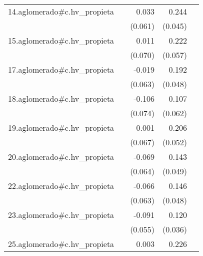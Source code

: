 {\begin{longtable}{l*{4}{D{.}{.}{-1}}}
\addlinespace
14.aglomerado#c.hv\_propieta&                     &       0.033         &       0.244\sym{***}&                     \\
            &                     &     (0.061)         &     (0.045)         &                     \\
\addlinespace
15.aglomerado#c.hv\_propieta&                     &       0.011         &       0.222\sym{***}&                     \\
            &                     &     (0.070)         &     (0.057)         &                     \\
\addlinespace
17.aglomerado#c.hv\_propieta&                     &      -0.019         &       0.192\sym{***}&                     \\
            &                     &     (0.063)         &     (0.048)         &                     \\
\addlinespace
18.aglomerado#c.hv\_propieta&                     &      -0.106         &       0.107         &                     \\
            &                     &     (0.074)         &     (0.062)         &                     \\
\addlinespace
19.aglomerado#c.hv\_propieta&                     &      -0.001         &       0.206\sym{***}&                     \\
            &                     &     (0.067)         &     (0.052)         &                     \\
\addlinespace
20.aglomerado#c.hv\_propieta&                     &      -0.069         &       0.143\sym{**} &                     \\
            &                     &     (0.064)         &     (0.049)         &                     \\
\addlinespace
22.aglomerado#c.hv\_propieta&                     &      -0.066         &       0.146\sym{**} &                     \\
            &                     &     (0.063)         &     (0.048)         &                     \\
\addlinespace
23.aglomerado#c.hv\_propieta&                     &      -0.091         &       0.120\sym{***}&                     \\
            &                     &     (0.055)         &     (0.036)         &                     \\
\addlinespace
25.aglomerado#c.hv\_propieta&                     &       0.003         &       0.226\sym{***}&                     \\

\end{longtable}}
